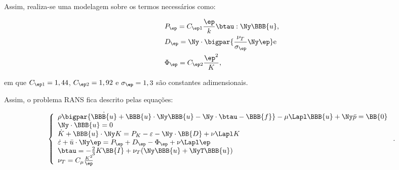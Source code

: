 Assim, realiza-se uma modelagem sobre os termos necessários como:

\begin{subequations}
    \begin{align}
         & P_\ep=C_{\ep 1}\frac{\ep}{k}\btau:\Ny\BBB{u}\text{,}          \\
         & D_\ep=\Ny\cdot\bigpar{\frac{\nu_T}{\sigma_\ep}\Ny\ep}\text{e} \\
         & \Phi_\ep=C_{\ep 2}\frac{\ep^2}{K}\text{,}
    \end{align}
\end{subequations}

\noindent em que $C_{\ep 1}=1,44$, $C_{\ep 2}=1,92$ e $\sigma_\ep=1,3$ são constantes adimensionais.

Assim, o problema RANS fica descrito pelas equações:

\begin{equation}
    \left\{
    \begin{array}{l}
        \rho\bigpar{\dot{\BBB{u}}+\BBB{u}\cdot\Ny\BBB{u}-\Ny\cdot\btau-\BBB{f}}-\mu\Lapl\BBB{u}+\Ny\bar{p}=\BB{0} \\
        \Ny\cdot\BBB{u}=0                                                                                         \\
        \dot{K}+\BBB{u}\cdot\Ny K=P_K-\varepsilon-\Ny\cdot\BB{D}+\nu\Lapl K                                       \\
        \dot{\varepsilon}+\bar{u}\cdot\Ny\ep=P_\ep+D_\ep-\Phi_\ep+\nu\Lapl\ep                                     \\
        \btau=-\frac{2}{3}K\BB{I}+\nu_T(\Ny\BBB{u}+\NyT\BBB{u})                                                   \\
        \nu_T=C_\mu\frac{K^2}{\ep}
    \end{array}
    \right.\text{.}
\end{equation}